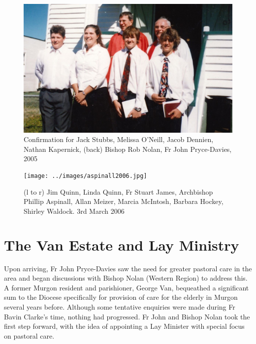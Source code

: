 \begin{figure}[!htb]
\begin{center}
\includegraphics[width=1.\textwidth,center]{../images/confirmation2005.jpg}
\caption{Confirmation for Jack Stubbs, Melissa O'Neill, Jacob Dennien, Nathan Kapernick, (back) Bishop Rob Nolan, Fr John Pryce-Davies, 2005}
\end{center}
\end{figure}










\begin{figure}[!htb]
\begin{center}
\texttt{[image: ../images/aspinall2006.jpg]}
\caption{(l to r) Jim Quinn, Linda Quinn, Fr Stuart James, Archbishop Phillip Aspinall, Allan Meizer, Marcia McIntosh, Barbara Hockey, Shirley Waldock. 3rd March 2006}
\end{center}
\end{figure}




\section{The Van Estate and Lay Ministry}



Upon arriving, Fr John Pryce-Davies saw the need for greater pastoral care in the area and began discussions with Bishop Nolan (Western Region) to address this. A former Murgon resident and parishioner, George Van, bequeathed a significant sum to the Diocese specifically for provision of care for the elderly in Murgon several years before. Although some tentative enquiries were made during Fr Bavin Clarke's time, nothing had progressed. Fr John and Bishop Nolan took the first step forward, with the idea of appointing a Lay Minister with special focus on pastoral care.



